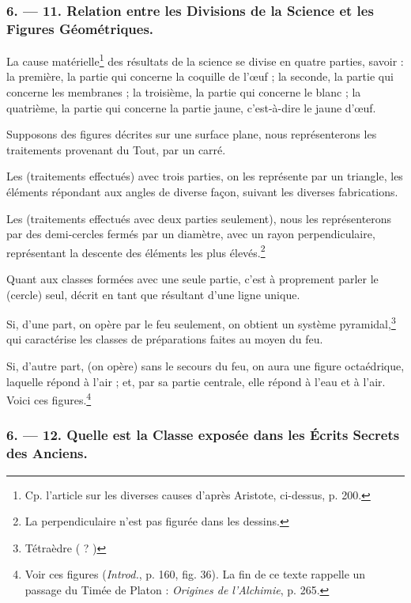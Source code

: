 \documentclass[a4paper, 11pt, oneside, polutonikogreek, french]{article}
\begin{document}
\bigskip
\centerline{\EightStarTaper}
\centerline{\EightStarTaper\EightStarTaper}
\bigskip

\subsubsection{6. --- 11. Relation entre les Divisions de la Science et les Figures Géométriques.}

La cause matérielle\footnote{Cp. l'article sur les diverses causes d'après Aristote, ci-dessus, p. 200.} des résultats de la science se divise en quatre parties, savoir : la première, la partie qui concerne la coquille de l'œuf ; la seconde, la partie qui concerne les membranes ; la troisième, la partie qui concerne le blanc ; la quatrième, la partie qui concerne la partie jaune, c'est-à-dire le jaune d'œuf.

Supposons des figures décrites sur une surface plane, nous représenterons les traitements provenant du Tout, par un carré.

Les (traitements effectués) avec trois parties, on les représente par un triangle, les éléments répondant aux angles de diverse façon, suivant les diverses fabrications.

Les (traitements effectués avec deux parties seulement), nous les représenterons par des demi-cercles fermés par un diamètre, avec un rayon perpendiculaire, représentant la descente des éléments les plus élevés.\footnote{La perpendiculaire n'est pas figurée dans les dessins.}

Quant aux classes formées avec une seule partie, c'est à proprement parler le (cercle) seul, décrit en tant que résultant d'une ligne unique.

Si, d'une part, on opère par le feu seulement, on obtient un système pyramidal,\footnote{Tétraèdre ( ? )} qui caractérise les classes de préparations faites au moyen du feu.

Si, d'autre part, (on opère) sans le secours du feu, on aura une figure octaédrique, laquelle répond à l'air ; et, par sa partie centrale, elle répond à l'eau et à l'air. Voici ces figures.\footnote{Voir ces figures (\emph{Introd.}, p. 160, fig. 36). La fin de ce texte rappelle un passage du Timée de Platon : \emph{Origines de l'Alchimie}, p. 265.}

\bigskip
\centerline{\EightStarTaper}
\centerline{\EightStarTaper\EightStarTaper}
\bigskip

\subsubsection{6. --- 12. Quelle est la Classe exposée dans les Écrits Secrets des Anciens.}
\end{document}
